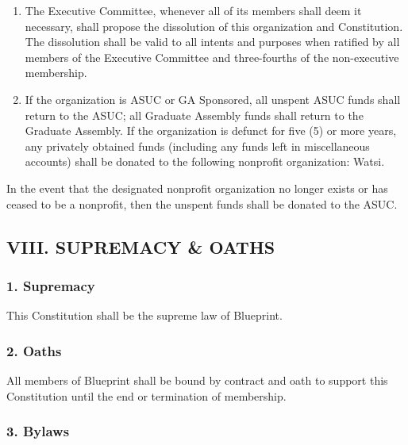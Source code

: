 \documentclass[
]{article}
\providecommand{\tightlist}{%
  \setlength{\itemsep}{0pt}\setlength{\parskip}{0pt}}
\begin{document}
\begin{enumerate}
\def\labelenumi{\arabic{enumi}.}
\tightlist
\item
  The Executive Committee, whenever all of its members shall deem it
  necessary, shall propose the dissolution of this organization and
  Constitution. The dissolution shall be valid to all intents and
  purposes when ratified by all members of the Executive Committee and
  three-fourths of the non-executive membership.
\item
  If the organization is ASUC or GA Sponsored, all unspent ASUC funds
  shall return to the ASUC; all Graduate Assembly funds shall return to
  the Graduate Assembly. If the organization is defunct for five (5) or
  more years, any privately obtained funds (including any funds left in
  miscellaneous accounts) shall be donated to the following nonprofit
  organization: Watsi.
\end{enumerate}

In the event that the designated nonprofit organization no longer exists
or has ceased to be a nonprofit, then the unspent funds shall be donated
to the ASUC.

\hypertarget{viii.-supremacy-oaths}{%
\subsection{VIII. SUPREMACY \& OATHS}\label{viii.-supremacy-oaths}}

\hypertarget{supremacy}{%
\subsubsection{1. Supremacy}\label{supremacy}}

This Constitution shall be the supreme law of Blueprint.

\hypertarget{oaths}{%
\subsubsection{2. Oaths}\label{oaths}}

All members of Blueprint shall be bound by contract and oath to support
this Constitution until the end or termination of membership.

\hypertarget{bylaws}{%
\subsubsection{3. Bylaws}\label{bylaws}}
\end{document}

